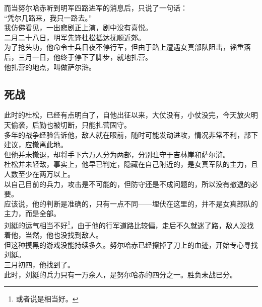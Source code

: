 \begin{multicols}{\theparacolNo}
而当努尔哈赤听到明军四路进军的消息后，只说了一句话：\\

“凭尔几路来，我只一路去。”\\

我仿佛看见，一出悲剧正上演，剧中没有喜悦。\\

二月二十八日，明军先锋杜松抵达抚顺近郊。\\

为了抢头功，他命令士兵日夜不停行军，但由于路上遭遇女真部队阻击，辎重落后，三月一日，他终于停下了脚步，就地扎营。\\

他扎营的地点，叫做萨尔浒。\\

\subsection{死战}
此时的杜松，已经有点明白了，自他出征以来，大仗没有，小仗没完，今天放火明天偷袭，后勤也被切断，只能扎营固守。\\

多年的战争经验告诉他，敌人就在眼前，随时可能发动进攻，情况非常不利，部下建议，应撤离此地。\\

但他并未撤退，却将手下六万人分为两部，分别驻守于吉林崖和萨尔浒。\\

杜松并未轻敌，事实上，他早已判定，隐藏在自己附近的，是女真军队的主力，且人数至少在两万以上。\\

以自己目前的兵力，攻击是不可能的，但防守还是不成问题的，所以没有撤退的必要。\\

应该说，他的判断是准确的，只有一点不同——埋伏在这里的，并不是女真部队的主力，而是全部。\\

刘綎的运气相当不好\footnote{或者说是相当好。}，由于他的行军道路比较偏，走后不久就迷了路，敌人没找着他，当然，他也没找到敌人。\\

但这种摸黑的游戏没能持续多久。努尔哈赤已经擦掉了刀上的血迹，开始专心寻找刘綎。\\

三月初四，他找到了。\\

此时，刘綎的兵力只有一万余人，是努尔哈赤的四分之一。胜负未战已分。\\


\end{multicols}
